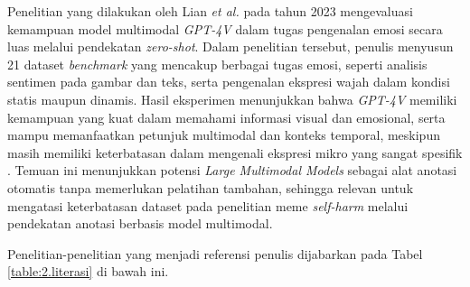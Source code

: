 Penelitian yang dilakukan oleh Lian \textit{et al.} pada tahun 2023 mengevaluasi kemampuan model multimodal \textit{GPT-4V} dalam tugas pengenalan emosi secara luas melalui pendekatan \textit{zero-shot}. Dalam penelitian tersebut, penulis menyusun 21 dataset \textit{benchmark} yang mencakup berbagai tugas emosi, seperti analisis sentimen pada gambar dan teks, serta pengenalan ekspresi wajah dalam kondisi statis maupun dinamis. Hasil eksperimen menunjukkan bahwa \textit{GPT-4V} memiliki kemampuan yang kuat dalam memahami informasi visual dan emosional, serta mampu memanfaatkan petunjuk multimodal dan konteks temporal, meskipun masih memiliki keterbatasan dalam mengenali ekspresi mikro yang sangat spesifik \cite{lian2023gpt4v}. Temuan ini menunjukkan potensi \textit{Large Multimodal Models} sebagai alat anotasi otomatis tanpa memerlukan pelatihan tambahan, sehingga relevan untuk mengatasi keterbatasan dataset pada penelitian meme \textit{self-harm} melalui pendekatan anotasi berbasis model multimodal.


Penelitian-penelitian yang menjadi referensi penulis dijabarkan pada Tabel \ref{table:2.literasi} di bawah ini. \par

